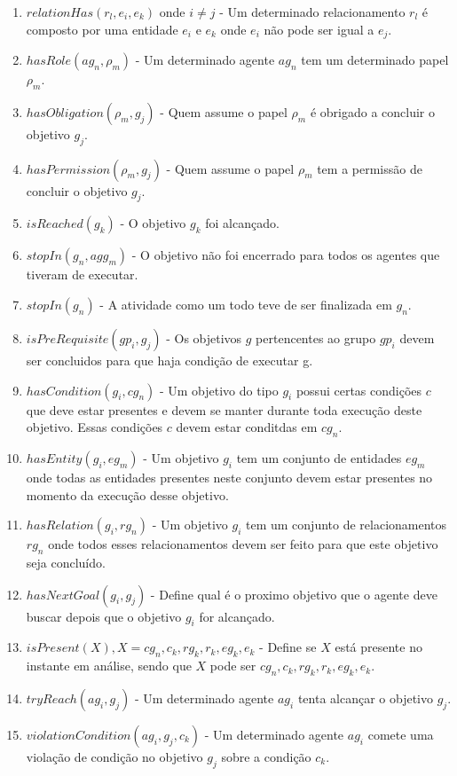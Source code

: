 \documentclass[12pt]{article}
\begin{document}
\begin{enumerate}
	\item $relationHas(r_l,e_i,e_k)$ onde $i \neq j$ - Um determinado relacionamento $r_l$ é composto por uma entidade $e_i$ e $e_k$ onde $e_i$ não pode ser igual a $e_j$.	
	\item $hasRole(ag_n,\rho_m)$ - Um determinado agente $ag_n$ tem um determinado papel $\rho_m$.
	\item $hasObligation(\rho_m,g_j)$ - Quem assume o papel $\rho_m$ é obrigado a concluir o objetivo $g_j$.
	\item $hasPermission(\rho_m,g_j)$ - Quem assume o papel $\rho_m$ tem a permissão de concluir o objetivo $g_j$.
	\item $isReached(g_k)$ - O objetivo $g_k$ foi alcançado.
	\item $stopIn(g_n,agg_m)$ - O objetivo não foi encerrado para todos os agentes que tiveram de executar. 	 				
	\item $stopIn(g_n)$ - A atividade como um todo teve de ser finalizada em $g_n$.	 			
	\item $isPreRequisite(gp_i,g_j)$ - Os objetivos $g$ pertencentes ao grupo $gp_i$ devem ser concluidos para que haja condição de executar g.
	\item $hasCondition(g_i,cg_n)$ - Um objetivo do tipo $g_i$ possui certas condições $c$ que deve estar presentes e devem se manter durante toda execução deste objetivo. Essas condições $c$ devem estar conditdas em $cg_n$. 
	\item $hasEntity(g_i,eg_m)$ - Um objetivo $g_i$ tem um conjunto de entidades $eg_m$ onde todas as entidades presentes neste conjunto devem estar presentes no momento da execução desse objetivo.
	\item $hasRelation(g_i,rg_n)$ - Um objetivo $g_i$ tem um conjunto de relacionamentos $rg_n$ onde todos esses relacionamentos devem ser feito para que este objetivo seja concluído.
	\item $hasNextGoal(g_i,g_j)$ - Define qual é o proximo objetivo que o agente deve buscar depois que o objetivo $g_i$ for alcançado.
	\item $isPresent(X), X = cg_n,c_k,rg_k,r_k,eg_k,e_k$ - Define se $X$ está presente no instante em análise, sendo que $X$ pode ser $cg_n,c_k,rg_k,r_k,eg_k,e_k$.
	\item $tryReach(ag_i,g_j)$ - Um determinado agente $ag_i$ tenta alcançar o objetivo $g_j$.
	\item $violationCondition(ag_i,g_j,c_k)$ - Um determinado agente $ag_i$ comete uma violação de condição no objetivo $g_j$ sobre a condição $c_k$. 

\end{enumerate}
\end{document}
